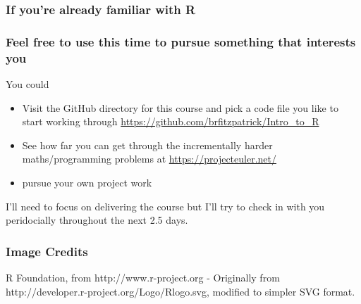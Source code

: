\documentclass[xcolor=dvipsnames]{beamer}
\begin{document}
\begin{frame}
\frametitle{If you're already familiar with R}
\frametitle{Feel free to use this time to pursue something that interests you}
You could
\begin{itemize}
\item Visit the GitHub directory for this course and pick a code file you like to start working through \url{https://github.com/brfitzpatrick/Intro_to_R}
\item See how far you can get through the incrementally harder maths/programming problems at \url{https://projecteuler.net/}
\item pursue your own project work
\end{itemize}
I'll need to focus on delivering the course but I'll try to check in with you peridocially throughout the next 2.5 days.
\end{frame}


\begin{frame} 
\frametitle{Image Credits}
R Foundation, from http://www.r-project.org - Originally from http://developer.r-project.org/Logo/Rlogo.svg, modified to simpler SVG format.
%
\end{frame}
\end{document}
